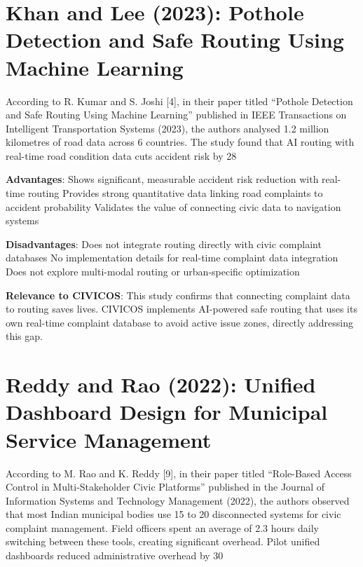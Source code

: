 \documentclass[12pt,a4paper]{report}
\begin{document}
\section{Khan and Lee (2023): Pothole Detection and Safe Routing Using Machine Learning}

According to R. Kumar and S. Joshi [4], in their paper titled “Pothole Detection and Safe Routing Using Machine Learning” published in IEEE Transactions on Intelligent Transportation Systems (2023), the authors analysed 1.2 million kilometres of road data across 6 countries. The study found that AI routing with real-time road condition data cuts accident risk by 28%

\textbf{Advantages}:
Shows significant, measurable accident risk reduction with real-time routing
Provides strong quantitative data linking road complaints to accident probability
Validates the value of connecting civic data to navigation systems

\textbf{Disadvantages}:
Does not integrate routing directly with civic complaint databases
No implementation details for real-time complaint data integration
Does not explore multi-modal routing or urban-specific optimization

\textbf{Relevance to CIVICOS}: This study confirms that connecting complaint data to routing saves lives. CIVICOS implements AI-powered safe routing that uses its own real-time complaint database to avoid active issue zones, directly addressing this gap.

\section{Reddy and Rao (2022): Unified Dashboard Design for Municipal Service Management}

According to M. Rao and K. Reddy [9], in their paper titled “Role-Based Access Control in Multi-Stakeholder Civic Platforms” published in the Journal of Information Systems and Technology Management (2022), the authors observed that most Indian municipal bodies use 15 to 20 disconnected systems for civic complaint management. Field officers spent an average of 2.3 hours daily switching between these tools, creating significant overhead. Pilot unified dashboards reduced administrative overhead by 30%
\end{document}
